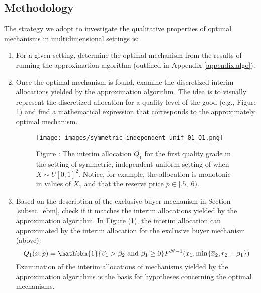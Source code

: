 \subsection{Methodology}\label{subsec_method}


The strategy we adopt to investigate the qualitative properties of optimal mechanisms in multidimensional settings is:

\begin{enumerate}
    \item For a given setting, determine the optimal mechanism from the results of running the approximation algorithm (outlined in Appendix \ref{appendix:algo}).

    \item Once the optimal mechanism is found, examine the discretized interim allocations yielded by the approximation algorithm. The idea is to visually represent the discretized allocation for a quality level of the good (e.g., Figure \ref{fig:belloni_n2_q1}) and find a mathematical expression that corresponds to the approximately optimal mechanism.

    \begin{figure}[H]
        \begin{center}
        \texttt{[image: images/symmetric\_independent\_unif\_01\_Q1.png]}
        \end{center}
        
        \vspace{1mm}
        \raggedright{\small {\sc Figure \thefig\label{fig:belloni_n2_q1}:} The interim allocation $Q_1$ for the first quality grade in the setting of symmetric, independent uniform setting of \autocite{pavlov2011optimal} when $X \sim U[0,1]^2$. Notice, for example, the allocation is monotonic in values of $X_1$ and that the reserve price $p \in [.5, .6)$.}
    \end{figure}

    \item Based on the description of the exclusive buyer mechanism in Section \ref{subsec_ebm}, check if it matches the interim allocations yielded by the approximation algorithm. In Figure (\ref{fig:belloni_n2_q1}), the interim allocation can approximated by the interim allocation for the exclusive buyer mechanism (above): 
    \begin{equation}
        Q_1(x;p) = \mathbbm{1}\{ \beta_1 > \beta_2 \text{ and } \beta_1 \geq 0 \}F^{N-1}(x_1, \min\{\overline{x}_2, r_2 + \beta_1\})
    \end{equation}
    \noindent Examination of the interim allocations of mechanisms yielded by the approximation algorithms is the basis for hypotheses concerning the optimal mechanisms.
\end{enumerate}

